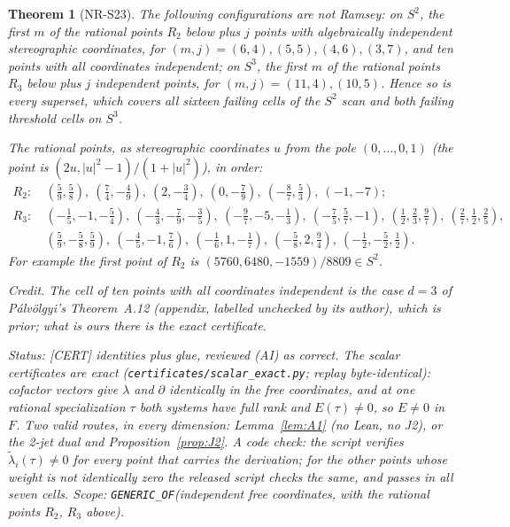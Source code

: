 \documentclass[11pt]{amsart}
\newcommand{\st}[1]{\textsf{[#1]}}
\theoremstyle{plain}
\newtheorem{theorem}{Theorem}[section]
\theoremstyle{definition}
\begin{document}
\begin{theorem}[NR-S23]\label{thm:NR}
The following configurations are not Ramsey: on $S^2$, the first $m$ of the rational points $R_2$
below plus $j$ points with algebraically independent stereographic coordinates, for
$(m,j)=(6,4),(5,5),(4,6),(3,7)$, and ten points with all coordinates independent; on $S^3$, the
first $m$ of the rational points $R_3$ below plus $j$ independent points, for $(m,j)=(11,4),(10,5)$.
Hence so is every superset, which covers all sixteen failing cells of the $S^2$ scan and both
failing threshold cells on $S^3$.

The rational points, as stereographic coordinates $u$ from the pole $(0,\dots,0,1)$ (the point is
$(2u,|u|^2-1)/(1+|u|^2)$), in order:
\begin{align*}
R_2:\ &(\tfrac59,\tfrac58),\ (\tfrac74,-\tfrac49),\ (2,-\tfrac34),\ (0,-\tfrac79),\ (-\tfrac87,\tfrac53),\
(-1,-7);\\
R_3:\ &(-\tfrac15,-1,-\tfrac54),\ (-\tfrac43,-\tfrac79,-\tfrac35),\ (-\tfrac97,-5,-\tfrac13),\
(-\tfrac75,\tfrac57,-1),\ (\tfrac12,\tfrac23,\tfrac97),\ (\tfrac27,\tfrac12,\tfrac25),\\
&(\tfrac59,-\tfrac58,\tfrac59),\ (-\tfrac45,-1,\tfrac76),\ (-\tfrac16,1,-\tfrac17),\
(-\tfrac58,2,\tfrac94),\ (-\tfrac12,-\tfrac52,\tfrac12).
\end{align*}
For example the first point of $R_2$ is $(5760,6480,-1559)/8809\in S^2$.

\smallskip\noindent\emph{Credit.} The cell of ten points with all coordinates independent is the case
$d=3$ of P\'alv\"olgyi's Theorem~A.12 \cite{Palvolgyi} (appendix, labelled unchecked by its author),
which is prior; what is ours there is the exact certificate.

\smallskip\noindent\emph{Status:} \st{CERT} identities plus glue, reviewed (AI) as correct. The
scalar certificates are exact (\texttt{certificates/scalar\_exact.py}; replay byte-identical): cofactor
vectors give $\lambda$ and $\partial$ identically in the free coordinates, and at one rational specialization
$\tau$ both systems have full rank and $E(\tau)\ne0$, so $E\ne0$ in $F$. Two valid routes, in every
dimension: Lemma~\ref{lem:A1} (no Lean, no J2), or the 2-jet dual and Proposition~\ref{prop:J2}. A code
check: the script verifies $\tilde\lambda_i(\tau)\ne0$ for every point that carries the derivation; for the
other points whose weight is not identically zero the released script checks the same, and passes in
all seven cells. Scope:
\texttt{GENERIC\_OF}(independent free coordinates, with the rational points $R_2$, $R_3$ above).
\end{theorem}
\end{document}
